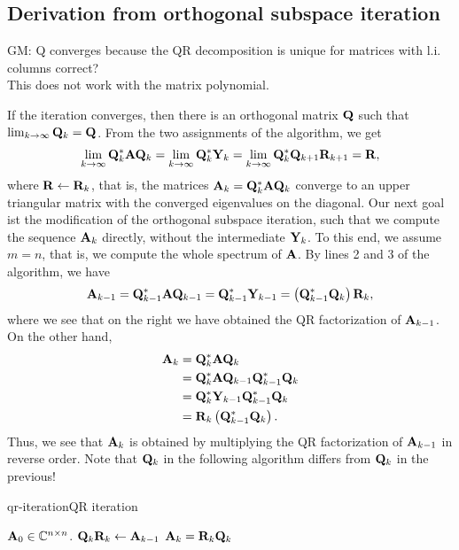 \subsection{Derivation from orthogonal subspace iteration}
\begin{todo}
  GM:
  Q converges because the QR decomposition is unique for matrices with l.i. columns correct? \\
  This does not work with the matrix polynomial.
\end{todo}
\begin{remark}
  If the iteration converges, then there is an orthogonal matrix $\mathbf Q$ such that $\lim_{k \to
  \infty} \mathbf Q_k = \mathbf Q$.
  From the two assignments of the algorithm, we get
  \begin{gather}
    \lim_{k \to \infty} \mathbf Q_k^* \mathbf A \mathbf Q_k = \lim_{k \to \infty} \mathbf Q_k^* \mathbf Y_k = \lim_{k \to \infty}
    \mathbf Q_k^*\mathbf Q_{k+1}\mathbf R_{k+1} = \mathbf R,
  \end{gather}
  where $\mathbf R\leftarrow\mathbf R_k$, that is, the matrices
  $\mathbf A_k = \mathbf Q_k^*\mathbf A\mathbf Q_k$ converge to an upper triangular
  matrix with the converged eigenvalues on the diagonal. Our next goal
  ist the modification of the orthogonal subspace iteration, such that
  we compute the sequence $\mathbf A_k$ directly, without the intermediate
  $\mathbf Y_k$. To this end, we assume $m=n$, that is, we compute the
  whole spectrum of $\mathbf A$. By lines 2 and 3 of the algorithm, we have
  \begin{gather*}
    \mathbf A_{k-1} = \mathbf Q_{k-1}^*\mathbf A\mathbf Q_{k-1} = \mathbf Q_{k-1}^* \mathbf Y_{k-1} = \left(\mathbf Q_{k-1}^*\mathbf Q_{k}\right)\mathbf R_k,
  \end{gather*}
  where we see that on the right we have obtained the QR factorization of $\mathbf A_{k-1}$.
  On the other hand,
  \begin{align*}
    \mathbf A_k
    &= \mathbf Q_k^*\mathbf A\mathbf Q_k\\
    &= \mathbf Q_k^*\mathbf A\mathbf Q_{k-1}\mathbf Q_{k-1}^*\mathbf Q_k\\
    &= \mathbf Q_k^*\mathbf Y_{k-1} \mathbf Q_{k-1}^*\mathbf Q_k\\
    &= \mathbf R_k \left(\mathbf Q_{k-1}^*\mathbf Q_k\right).
  \end{align*}
  Thus, we see that $\mathbf A_k$ is obtained by multiplying the QR
  factorization of $\mathbf A_{k-1}$ in reverse order. Note that $\mathbf Q_k$
  in the following algorithm differs from $\mathbf Q_k$ in the previous!
\end{remark}

\begin{Algorithm*}{qr-iteration}{QR iteration}
  \begin{algorithmic}[1]
    \Require $\mathbf A_0\in\mathbb C^{n\times n}$.
    \State $\mathbf Q_k\mathbf R_k \gets \mathbf A_{k-1}$ 
    \State $\mathbf A_{k} = \mathbf R_k\mathbf Q_k$
    \EndFor
  \end{algorithmic}
\end{Algorithm*}

